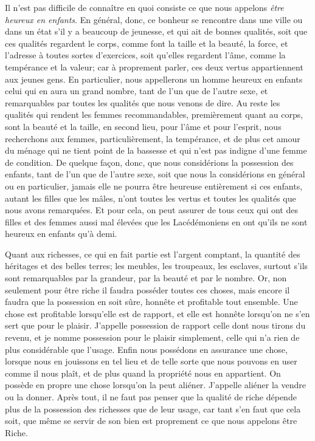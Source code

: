 \bigbreak

Il n'est pas difficile de connaître en quoi consiste ce que nous appelons \emph{être heureux en enfants}. En général, donc,
ce bonheur se rencontre dans une ville ou dans un état s'il y a beaucoup de jeunesse, et qui ait de bonnes qualités, soit
que ces qualités regardent le corps, comme font la taille et la beauté, la force, et l'adresse à toutes sortes d'exercices,
soit qu'elles regardent l’âme, comme la tempérance et la valeur; car à proprement parler, ces deux vertus appartiennent aux
jeunes gens. En particulier, nous appellerons un homme heureux en enfants celui qui en aura un grand nombre, tant de l'un que
de l'autre sexe, et remarquables par toutes les qualités que nous venons de dire. Au reste les qualités qui rendent les femmes
recommandables, premièrement quant au corps, sont la beauté et la taille, en second lieu, pour l’âme et pour l'esprit, nous
recherchons aux femmes, particulièrement, la tempérance, et de plus cet amour du ménage qui ne tient point de la bassesse et
qui n'est pas indigne d'une femme de condition. De quelque façon, donc, que nous considérions la possession des enfants, tant
de l'un que de l'autre sexe, soit que nous la considérions en général ou en particulier, jamais elle ne pourra être heureuse
entièrement si ces enfants, autant les filles que les mâles, n'ont toutes les vertus et toutes les qualités que nous avons
remarquées. Et pour cela, on peut assurer de tous ceux qui ont des filles et des femmes aussi mal élevées que les Lacédémoniens
en ont qu'ils ne sont heureux en enfants qu'à demi.

\bigbreak

Quant aux richesses, ce qui en fait partie est l'argent comptant, la quantité des héritages et des belles terres; les meubles,
les troupeaux, les esclaves, surtout s'ils sont remarquables par la grandeur, par la beauté et par le nombre. Or, non seulement
pour être riche il faudra posséder toutes ces choses, mais encore il faudra que la possession en soit sûre, honnête et profitable
tout ensemble. Une chose est profitable lorsqu'elle est de rapport, et elle est honnête lorsqu'on ne s'en sert que pour le plaisir.
J'appelle possession de rapport celle dont nous tirons du revenu, et je nomme possession pour le plaisir simplement, celle qui n'a
rien de plus considérable que l'usage. Enfin nous possédons en assurance une chose, lorsque nous en jouissons en tel lieu et de
telle sorte que nous pouvons en user comme il nous plaît, et de plus quand la propriété nous en appartient. On possède en propre une
chose lorsqu'on la peut aliéner. J'appelle aliéner la vendre ou la donner. Après tout, il ne faut pas penser que la qualité de riche
dépende plus de la possession des richesses que de leur usage, car tant s'en faut que cela soit, que même se servir de son bien est
proprement ce que nous appelons être Riche.


